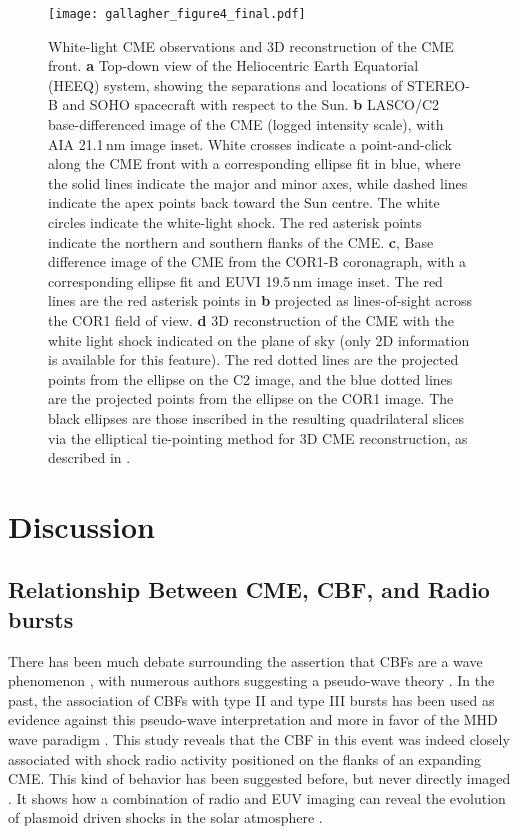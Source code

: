 \begin{figure}[!h]
\begin{center}
\texttt{[image: gallagher\_figure4\_final.pdf]}
\caption{White-light CME observations and 3D reconstruction of the CME front. {\bf a} Top-down view of the Heliocentric Earth Equatorial (HEEQ) system, showing the separations and locations of STEREO-B and SOHO spacecraft with respect to the Sun. {\bf b} LASCO/C2 base-differenced image of the CME (logged intensity scale), with AIA 21.1\,nm image inset. White crosses indicate a point-and-click along the CME front with a corresponding ellipse fit in blue, where the solid lines indicate the major and minor axes, while dashed lines indicate the apex points back toward the Sun centre. The white circles indicate the white-light shock. The red asterisk points indicate the northern and southern flanks of the CME. {\bf c}, Base difference image of the CME from the COR1-B coronagraph, with a corresponding ellipse fit and EUVI 19.5\,nm image inset. The red lines are the red asterisk points in {\bf b} projected as lines-of-sight across the COR1 field of view. {\bf d} 3D reconstruction of the CME with the white light shock indicated on the plane of sky (only 2D information is available for this feature). The red dotted lines are the projected points from the ellipse on the C2 image, and the blue dotted lines are the projected points from the ellipse on the COR1 image. The black ellipses are those inscribed in the resulting quadrilateral slices via the elliptical tie-pointing method for 3D CME reconstruction, as described in \citep{byrne2010}.}
\label{fig:3d_cme}
\end{center}
\end{figure}
\clearpage


\section{Discussion}

\subsection{Relationship Between CME, CBF, and Radio bursts}\label{sec:31}

There has been much debate surrounding the assertion that CBFs are a wave phenomenon \citep{gallagher2011}, with numerous authors suggesting a pseudo-wave theory \citep{delannee2008}. In the past, the association of CBFs with type II and type III bursts has been used as evidence against this pseudo-wave interpretation and more in favor of the MHD wave paradigm \citep{warmuth2004b, grechnev2011}. This study reveals that the CBF in this event was indeed closely associated with shock radio activity positioned on the flanks of an expanding CME. This kind of behavior has been suggested before, but never directly imaged \citep{kozarev2011, feng2012, feng2013}. It shows how a combination of radio and EUV imaging can reveal the evolution of plasmoid driven shocks in the solar atmosphere \citep{bain2012}.

